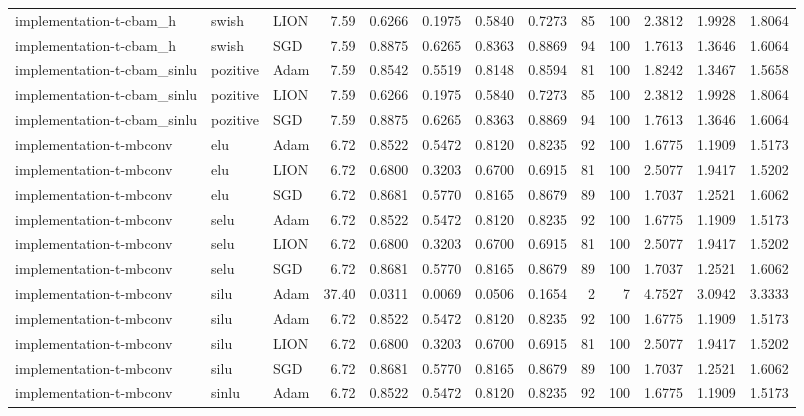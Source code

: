 \begin{table}[htbp]
{\begin{tabular}{lllrrrrrrrrrr}
implementation-t-cbam_h & swish & LION & 7.59 & 0.6266 & 0.1975 & 0.5840 & 0.7273 & 85 & 100 & 2.3812 & 1.9928 & 1.8064 \\
implementation-t-cbam_h & swish & SGD & 7.59 & 0.8875 & 0.6265 & 0.8363 & 0.8869 & 94 & 100 & 1.7613 & 1.3646 & 1.6064 \\
implementation-t-cbam_sinlu & pozitive & Adam & 7.59 & 0.8542 & 0.5519 & 0.8148 & 0.8594 & 81 & 100 & 1.8242 & 1.3467 & 1.5658 \\
implementation-t-cbam_sinlu & pozitive & LION & 7.59 & 0.6266 & 0.1975 & 0.5840 & 0.7273 & 85 & 100 & 2.3812 & 1.9928 & 1.8064 \\
implementation-t-cbam_sinlu & pozitive & SGD & 7.59 & 0.8875 & 0.6265 & 0.8363 & 0.8869 & 94 & 100 & 1.7613 & 1.3646 & 1.6064 \\
implementation-t-mbconv & elu & Adam & 6.72 & 0.8522 & 0.5472 & 0.8120 & 0.8235 & 92 & 100 & 1.6775 & 1.1909 & 1.5173 \\
implementation-t-mbconv & elu & LION & 6.72 & 0.6800 & 0.3203 & 0.6700 & 0.6915 & 81 & 100 & 2.5077 & 1.9417 & 1.5202 \\
implementation-t-mbconv & elu & SGD & 6.72 & 0.8681 & 0.5770 & 0.8165 & 0.8679 & 89 & 100 & 1.7037 & 1.2521 & 1.6062 \\
implementation-t-mbconv & selu & Adam & 6.72 & 0.8522 & 0.5472 & 0.8120 & 0.8235 & 92 & 100 & 1.6775 & 1.1909 & 1.5173 \\
implementation-t-mbconv & selu & LION & 6.72 & 0.6800 & 0.3203 & 0.6700 & 0.6915 & 81 & 100 & 2.5077 & 1.9417 & 1.5202 \\
implementation-t-mbconv & selu & SGD & 6.72 & 0.8681 & 0.5770 & 0.8165 & 0.8679 & 89 & 100 & 1.7037 & 1.2521 & 1.6062 \\
implementation-t-mbconv & silu & Adam & 37.40 & 0.0311 & 0.0069 & 0.0506 & 0.1654 & 2 & 7 & 4.7527 & 3.0942 & 3.3333 \\
implementation-t-mbconv & silu & Adam & 6.72 & 0.8522 & 0.5472 & 0.8120 & 0.8235 & 92 & 100 & 1.6775 & 1.1909 & 1.5173 \\
implementation-t-mbconv & silu & LION & 6.72 & 0.6800 & 0.3203 & 0.6700 & 0.6915 & 81 & 100 & 2.5077 & 1.9417 & 1.5202 \\
implementation-t-mbconv & silu & SGD & 6.72 & 0.8681 & 0.5770 & 0.8165 & 0.8679 & 89 & 100 & 1.7037 & 1.2521 & 1.6062 \\
implementation-t-mbconv & sinlu & Adam & 6.72 & 0.8522 & 0.5472 & 0.8120 & 0.8235 & 92 & 100 & 1.6775 & 1.1909 & 1.5173 \\

\end{tabular}}
\end{table}
